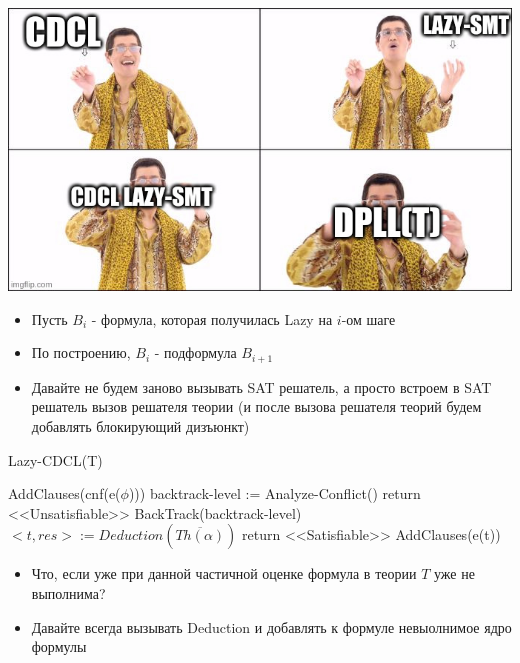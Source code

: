 \documentclass{beamer}
\begin{document}
\begin{frame}
\includegraphics[scale=0.45]{pineapple}
\end{frame}

\begin{frame}
\begin{itemize}
\item Пусть $B_i$ - формула, которая получилась Lazy на $i$-ом шаге
\item По построению, $B_i$ - подформула $B_{i+1}$
\item Давайте не будем заново вызывать SAT решатель, а просто встроем в SAT решатель вызов решателя теории (и после вызова
решателя теорий будем добавлять блокирующий дизъюнкт)
\end{itemize}
\end{frame}

\begin{frame}{Lazy-CDCL(T)}
\begin{algorithmic}
\State AddClauses(cnf(e($\phi$)))
        \State backtrack-level := Analyze-Conflict()
            \State return <<Unsatisfiable>>
        \Else
            \State BackTrack(backtrack-level)
        \EndIf
            \State $<t, res> := Deduction(\overline{Th(\alpha)})$
                \State return <<Satisfiable>>
            \EndIf
            \State AddClauses(e(t))
        \EndIf
    \EndWhile
\EndWhile
\end{algorithmic}
\end{frame}

\begin{frame}
\begin{itemize}
\item Что, если уже при данной частичной оценке формула в теории $T$ уже не выполнима?
\item Давайте всегда вызывать Deduction и добавлять к формуле невыолнимое ядро формулы
\end{itemize}
\end{frame}
\end{document}
